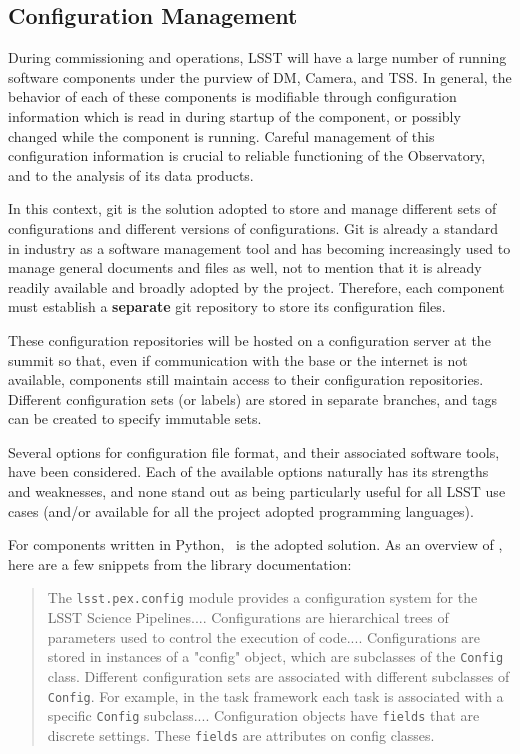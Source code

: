 \subsection{Configuration Management}\label{sect:config}
During commissioning and operations, LSST will have a large number of running software components under the purview of DM, Camera, and TSS. In general, the behavior of each of these components is modifiable through configuration information which is read in during startup of the component, or possibly changed while the component is running. Careful management of this configuration information is crucial to reliable functioning of the Observatory, and to the analysis of its data products.

In this context, git is the solution adopted to store and manage different sets of configurations and different versions of configurations. Git is already a standard in industry as a software management tool and has becoming increasingly used to manage general documents and files as well, not to mention that it is already readily available and broadly adopted by the project. Therefore, each component must establish a {\bf separate} git repository to store its configuration files. 

These configuration repositories will be hosted on a configuration server at the summit so that, even if communication with the base or the internet is not available, components still maintain access to their configuration repositories. Different configuration sets (or labels) are stored in separate branches, and tags can be created to specify immutable sets. 

Several options for configuration file format, and their associated software tools, have been considered. Each of the available options naturally has its strengths and weaknesses, and none stand out as being particularly useful for all LSST use cases (and/or available for all the project adopted programming languages).

For components written in Python, \pexC~is the adopted solution. As an overview of \pexC, here are a few snippets from the library documentation:

\begin{quotation}
The \texttt{lsst.pex.config} module provides a configuration system for the LSST Science Pipelines.... Configurations are hierarchical trees of parameters used to control the execution of code.... Configurations are stored in instances of a "config" object, which are subclasses of the \texttt{Config} class. Different configuration sets are associated with different subclasses of \texttt{Config}. For example, in the task framework each task is associated with a specific \texttt{Config} subclass.... Configuration objects have \texttt{fields} that are discrete settings. These \texttt{fields} are attributes on config classes.
\end{quotation}

